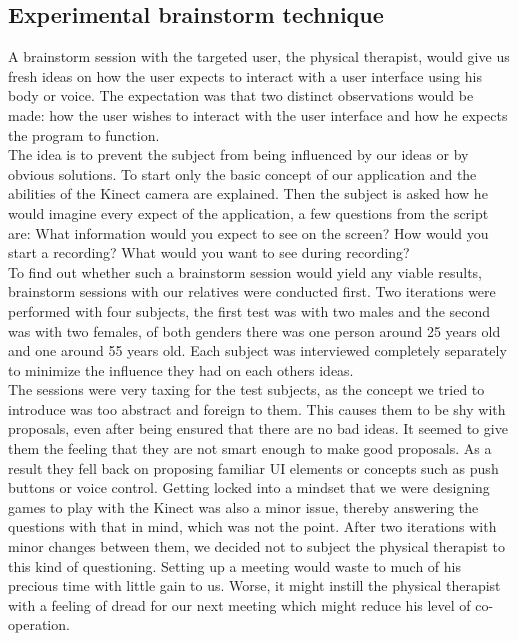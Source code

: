 \subsection{Experimental brainstorm technique}

A brainstorm session with the targeted user, the physical therapist, would give us fresh ideas on how the user expects to interact with a user interface using his body or voice. The expectation was that two distinct observations would be made: how the user wishes to interact with the user interface and how he expects the program to function.\\


The idea is to prevent the subject from being influenced by our ideas or by obvious solutions. To start only the basic concept of our application and the abilities of the Kinect camera are explained. Then the subject is asked how he would imagine every expect of the application, a few questions from the script are: What information would you expect to see on the screen? How would you start a recording? What would you want to see during recording?\\

To find out whether such a brainstorm session would yield any viable results, brainstorm sessions with our relatives were conducted first. Two iterations were performed with four subjects, the first test was with two males and the second was with two females, of both genders there was one person around 25 years old and one around 55 years old. Each subject was interviewed completely separately to minimize the influence they had on each others ideas.\\

The sessions were very taxing for the test subjects, as the concept we tried to introduce was too abstract and foreign to them. This causes them to be shy with proposals, even after being ensured that there are no bad ideas. It seemed to give them the feeling that they are not smart enough to make good proposals. As a result they fell back on proposing  familiar UI elements or concepts such as push buttons or voice control. Getting locked into a mindset that we were designing games to play with the Kinect was also a minor issue, thereby answering the questions with that in mind, which was not the point. After two iterations with minor changes between them, we decided not to subject the physical therapist to this kind of questioning. Setting up a meeting would waste to much of his precious time with little gain to us. Worse, it might instill the physical therapist with a feeling of dread for our next meeting which might reduce his level of co-operation.\\

